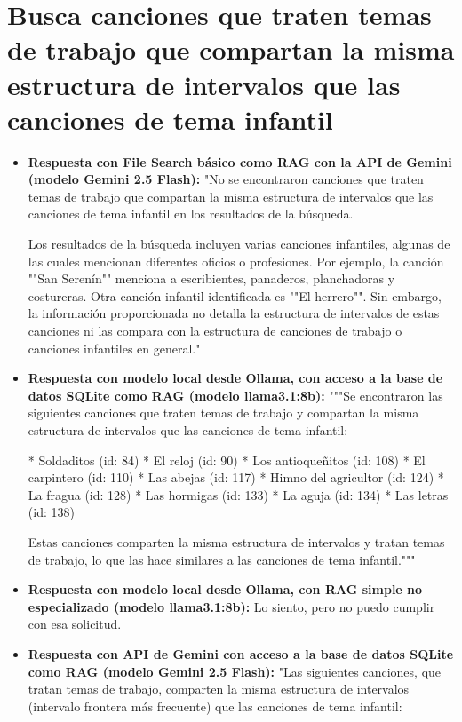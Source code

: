 \section{Busca canciones que traten temas de trabajo que compartan la misma estructura de intervalos que las canciones de tema infantil}
\begin{itemize}
    \item \textbf{Respuesta con File Search básico como RAG con la API de Gemini (modelo Gemini 2.5 Flash):} "No se encontraron canciones que traten temas de trabajo que compartan la misma estructura de intervalos que las canciones de tema infantil en los resultados de la búsqueda.

Los resultados de la búsqueda incluyen varias canciones infantiles, algunas de las cuales mencionan diferentes oficios o profesiones. Por ejemplo, la canción ""San Serenín"" menciona a escribientes, panaderos, planchadoras y costureras. Otra canción infantil identificada es ""El herrero"". Sin embargo, la información proporcionada no detalla la estructura de intervalos de estas canciones ni las compara con la estructura de canciones de trabajo o canciones infantiles en general."
    \item \textbf{Respuesta con modelo local desde Ollama, con acceso a la base de datos SQLite como RAG (modelo llama3.1:8b):} """Se encontraron las siguientes canciones que traten temas de trabajo y compartan la misma estructura de intervalos que las canciones de tema infantil:

* Soldaditos (id: 84)
* El reloj (id: 90)
* Los antioqueñitos (id: 108)
* El carpintero (id: 110)
* Las abejas (id: 117)
* Himno del agricultor (id: 124)
* La fragua (id: 128)
* Las hormigas (id: 133)
* La aguja (id: 134)
* Las letras (id: 138)

Estas canciones comparten la misma estructura de intervalos y tratan temas de trabajo, lo que las hace similares a las canciones de tema infantil."""
\item \textbf{Respuesta con modelo local desde Ollama, con RAG simple no especializado (modelo llama3.1:8b):} Lo siento, pero no puedo cumplir con esa solicitud.
\item \textbf{Respuesta con API de Gemini con acceso a la base de datos SQLite como RAG (modelo Gemini 2.5 Flash):} "Las siguientes canciones, que tratan temas de trabajo, comparten la misma estructura de intervalos (intervalo frontera más frecuente) que las canciones de tema infantil:


\end{itemize}

